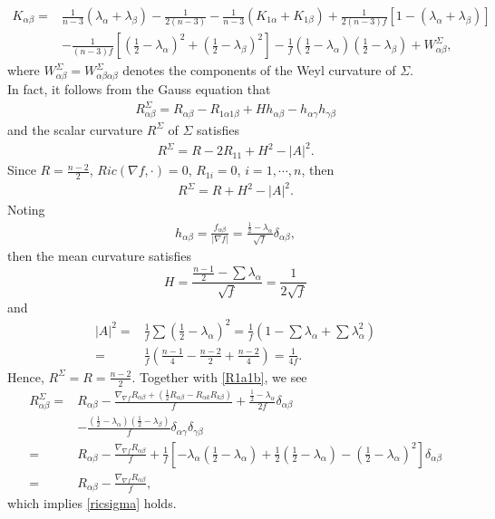 \documentclass[12pt]{amsart}
\newcommand{\ban}{\begin{eqnarray*}}
\newcommand{\ean}{\end{eqnarray*}}
\begin{document}
	\begin{equation}\label{kab}
	\begin{aligned}
	K_{\alpha \beta }=&{\frac{1}{n-3}}(\lambda_{\alpha}+\lambda_{\beta})-{\frac{1}{2(n-3)}}-{\frac{1}{n-3}}(K_{1\alpha }+K_{1\beta })+{\frac{1}{2(n-3)f}}[1-(\lambda_{\alpha }+\lambda_{\beta})] \\
	&- {\frac{1}{(n-3)f}}\left[ ({\frac{1}{2}}-\lambda_{\alpha})^2+({\frac{1}{2}}-\lambda_{\beta})^2\right]-{\frac{1}{f}}({\frac{1}{2}}-\lambda_{\alpha})({\frac{1}{2}}-\lambda_{\beta})+W^{\Sigma}_{\alpha \beta},
	\end{aligned}
	\end{equation}
	where $W^{\Sigma}_{\alpha \beta}=W^{\Sigma}_{\alpha \beta\alpha \beta} $ denotes the components of the Weyl curvature of ${\Sigma}$.	\\
	
	
	In fact, it follows from the Gauss equation that
	\ban
	R^{\Sigma}_{\alpha  \beta }=R_{\alpha  \beta }-R_{1\alpha 1 \beta }+Hh_{\alpha  \beta }-h_{\alpha\gamma }h_{\gamma\beta}
	\ean
	and the scalar curvature $R^{\Sigma}$ of ${\Sigma}$ satisfies
	\ban
	R^{\Sigma}=R-2R_{11}+H^2-|A|^2.
	\ean
	Since $R=\frac{n-2}{2}$, $Ric(\nabla f, \cdot)=0$, $R_{1i}=0$, $i=1,\cdots ,n$, then
	\ban
	R^{\Sigma}=R+H^2-|A|^2.
	\ean
	Noting
	\ban
	h_{\alpha \beta }=\frac{f_{\alpha \beta }}{|\nabla f|}=\frac{\frac{1}{2}-\lambda_\alpha}{\sqrt{f}}\delta_{\alpha \beta},
	\ean
	then the mean curvature satisfies
	\[
	H=\frac{\frac{n-1}{2}-\sum\lambda_\alpha}{\sqrt{f}}=\frac{1}{2\sqrt{f}}
	\]
	and
	\begin{align*}
	|A|^2=&\frac{1}{f}\sum(\frac{1}{2}-\lambda_\alpha)^2=\frac{1}{f}(1-\sum\lambda_\alpha+\sum \lambda_\alpha^2)\\
	=&\frac{1}{f}(\frac{n-1}{4}-\frac{n-2}{2}+\frac{n-2}{4})=\frac{1}{4f}.
	\end{align*}
	Hence, $R^{\Sigma}=R=\frac{n-2}{2}$. Together with \eqref{R1a1b}, we see
	\begin{equation*}
	\begin{aligned}
	R^{\Sigma}_{\alpha  \beta }=&R_{\alpha  \beta }-\frac{\nabla_{\nabla f} R_{\alpha \beta}+\left( \frac{1}{2}R_{\alpha \beta}-R_{\alpha k}R_{k\beta}\right) }{f}
	+\frac{\frac{1}{2}-\lambda_\alpha}{2f}\delta_{\alpha \beta}\\
	&-\frac{(\frac{1}{2}-\lambda_\alpha)(\frac{1}{2}-\lambda_\beta)}{f}\delta_{\alpha \gamma}\delta_{\gamma\beta}\\
	=&R_{\alpha  \beta }-\frac{ \nabla_{\nabla f} R_{\alpha \beta}}{f}+\frac{1}{f}[-\lambda_\alpha(\frac{1}{2}-\lambda_\alpha)+\frac{1}{2}(\frac{1}{2}-\lambda_\alpha)-(\frac{1}{2}-\lambda_\alpha)^2]\delta_{\alpha \beta}\\
	=&R_{\alpha  \beta }-\frac{\nabla _{\nabla f}  R_{\alpha \beta}}{f},
	\end{aligned}
	\end{equation*}
	which implies \eqref{ricsigma} holds.
	
\end{document}
